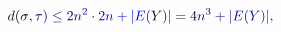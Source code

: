 \documentclass[12pt]{article}
\begin{document}
\makeatletter
\renewcommand*{\@textcolor}[3]{%
  \protect\leavevmode
  \begingroup
    \color#1{#2}#3%
  \endgroup
}
\makeatother
\begin{displaymath}
\mathcolor[RGB]{0,0,15}{d} \mathcolor[RGB]{0,0,30}{(} \mathcolor[RGB]{0,0,45}{\sigma} \mathcolor[RGB]{0,0,60}{,} \mathcolor[RGB]{0,0,75}{\tau} \mathcolor[RGB]{0,0,90}{)} \mathcolor[RGB]{0,0,105}{\leq} \mathcolor[RGB]{0,0,120}{2} \mathcolor[RGB]{0,0,135}{n} ^ { \mathcolor[RGB]{0,0,150}{2} } \mathcolor[RGB]{0,0,165}{\cdot} \mathcolor[RGB]{0,0,180}{2} \mathcolor[RGB]{0,0,195}{n} \mathcolor[RGB]{0,0,210}{+} \mathcolor[RGB]{0,0,225}{|} \mathcolor[RGB]{0,0,240}{E} \mathcolor[RGB]{0,0,255}{(} \mathcolor[RGB]{0,15,0}{Y} \mathcolor[RGB]{0,15,15}{)} \mathcolor[RGB]{0,15,30}{|} \mathcolor[RGB]{0,15,45}{=} \mathcolor[RGB]{0,15,60}{4} \mathcolor[RGB]{0,15,75}{n} ^ { \mathcolor[RGB]{0,15,90}{3} } \mathcolor[RGB]{0,15,105}{+} \mathcolor[RGB]{0,15,120}{|} \mathcolor[RGB]{0,15,135}{E} \mathcolor[RGB]{0,15,150}{(} \mathcolor[RGB]{0,15,165}{Y} \mathcolor[RGB]{0,15,180}{)} \mathcolor[RGB]{0,15,195}{|} \mathcolor[RGB]{0,15,210}{,}
\end{displaymath}
\end{document}
